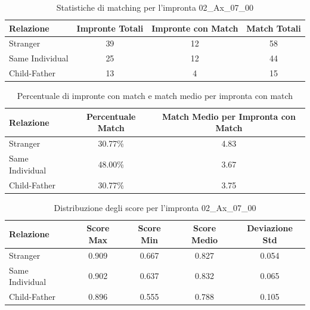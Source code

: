 \begin{table}[htbp]
\centering
\caption{Statistiche di matching per l'impronta 02\_Ax\_07\_00}
\label{tab:results_02_Ax_07_00}
\begin{tabular}{|l|c|c|c|}
\hline
\textbf{Relazione} & \textbf{Impronte Totali} & \textbf{Impronte con Match} & \textbf{Match Totali} \\
\hline
Stranger & 39 & 12 & 58 \\
\hline
Same Individual & 25 & 12 & 44 \\
\hline
Child-Father & 13 & 4 & 15 \\
\hline
\end{tabular}
\end{table}


\begin{table}[htbp]
\centering
\caption{Percentuale di impronte con match e match medio per impronta con match}
\label{tab:match_percentage_02_Ax_07_00}
\begin{tabular}{|l|c|c|}
\hline
\textbf{Relazione} & \textbf{Percentuale Match} & \textbf{Match Medio per Impronta con Match} \\
\hline
Stranger & 30.77\% & 4.83 \\
\hline
Same Individual & 48.00\% & 3.67 \\
\hline
Child-Father & 30.77\% & 3.75 \\
\hline
\end{tabular}
\end{table}


\begin{table}[htbp]
\centering
\caption{Distribuzione degli score per l'impronta 02\_Ax\_07\_00}
\label{tab:scores_02_Ax_07_00}
\begin{tabular}{|l|c|c|c|c|}
\hline
\textbf{Relazione} & \textbf{Score Max} & \textbf{Score Min} & \textbf{Score Medio} & \textbf{Deviazione Std} \\
\hline
Stranger & 0.909 & 0.667 & 0.827 & 0.054 \\
\hline
Same Individual & 0.902 & 0.637 & 0.832 & 0.065 \\
\hline
Child-Father & 0.896 & 0.555 & 0.788 & 0.105 \\
\hline
\end{tabular}
\end{table}

